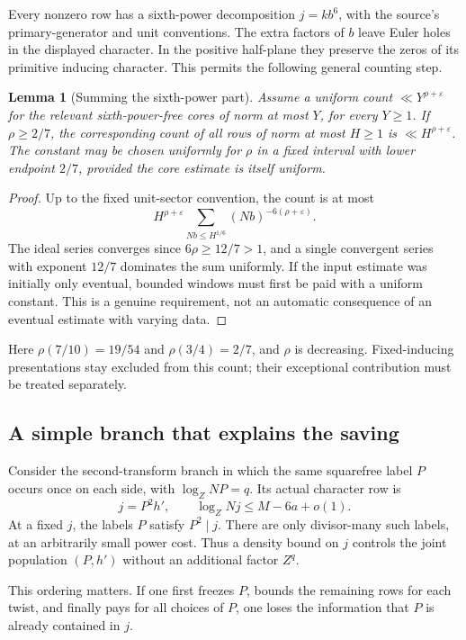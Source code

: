 \documentclass[11pt]{article}
\newtheorem{lemma}[proposition]{Lemma}
\theoremstyle{definition}
\newcommand{\eps}{\varepsilon}
\begin{document}
Every nonzero row has a sixth-power decomposition $j=kb^6$, with the
source's primary-generator and unit conventions. The extra factors of
$b$ leave Euler holes in the displayed character. In the positive
half-plane they preserve the zeros of its primitive inducing character.
This permits the following general counting step.

\begin{lemma}[Summing the sixth-power part]\label{lem:sixth}
Assume a uniform count $\ll Y^{\rho+\eps}$ for the relevant
sixth-power-free cores of norm at most $Y$, for every $Y\ge1$.
If $\rho\ge2/7$, the corresponding count of all rows of norm at most
$H\ge1$ is $\ll H^{\rho+\eps}$. The constant may be chosen uniformly
for $\rho$ in a fixed interval with lower endpoint $2/7$, provided the
core estimate is itself uniform.
\end{lemma}
\begin{proof}
Up to the fixed unit-sector convention, the count is at most
\[
 H^{\rho+\eps}\sum_{Nb\le H^{1/6}}(Nb)^{-6(\rho+\eps)}.
\]
The ideal series converges since $6\rho\ge12/7>1$, and a single
convergent series with exponent $12/7$ dominates the sum uniformly.
If the input estimate was initially only eventual, bounded windows must
first be paid with a uniform constant. This is a genuine requirement,
not an automatic consequence of an eventual estimate with varying data.
\end{proof}

Here $\rho(7/10)=19/54$ and $\rho(3/4)=2/7$, and $\rho$ is decreasing.
Fixed-inducing presentations stay excluded from this count; their
exceptional contribution must be treated separately.

\subsection{A simple branch that explains the saving}
Consider the second-transform branch in which the same squarefree label
$P$ occurs once on each side, with $\log_Z NP=q$. Its actual character
row is
\[
 j=P^2h',\qquad \log_Z Nj\le M-6a+o(1).
\]
At a fixed $j$, the labels $P$ satisfy $P^2\mid j$. There are only
divisor-many such labels, at an arbitrarily small power cost. Thus a
density bound on $j$ controls the joint population $(P,h')$ without
an additional factor $Z^q$.

This ordering matters. If one first freezes $P$, bounds the remaining
rows for each twist, and finally pays for all choices of $P$, one loses
the information that $P$ is already contained in $j$.
\end{document}
